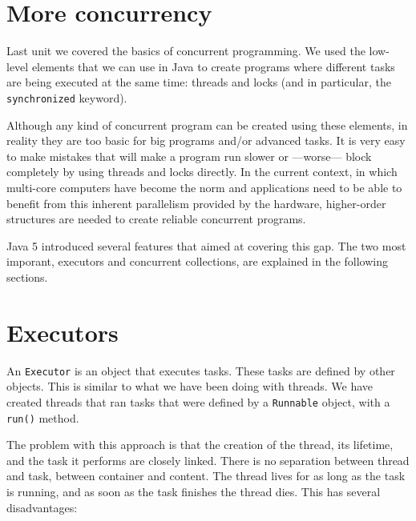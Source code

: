 

\section{More concurrency}
\label{sec:more-concurrency}

Last unit we covered the basics of concurrent programming. We used the
low-level elements that we can use in Java to create programs where
different tasks are being executed at the same time: threads and
locks (and in particular, the \verb+synchronized+ keyword). 

Although any kind of concurrent program can be created using these
elements, in reality they are too basic for big programs and/or
advanced tasks. It is very easy to make mistakes that will make a
program run slower or ---worse--- block completely by using threads
and locks directly. In the current context, in which multi-core
computers have become the norm and applications need to be able to
benefit from this inherent parallelism provided by the hardware,
higher-order structures are needed to create reliable concurrent
programs. 

Java 5 introduced several features that aimed at covering this
gap. The two most imporant, executors and concurrent collections, are
explained in the following sections.


\section{Executors}
\label{sec:executors}

An \verb+Executor+ is an object that executes tasks. These tasks are
defined by other objects. 
%
This is similar to what we have been doing with threads. We have
created threads that ran tasks that were defined by a \verb+Runnable+
object, with a \verb+run()+ method. 

The problem with this approach is that the creation of the thread, its
lifetime, and the task it performs are closely linked. There is no
separation between thread and task, between container and
content. The thread lives for as long as the task is running, and as
soon as the task finishes the thread dies. This has several
disadvantages: 


